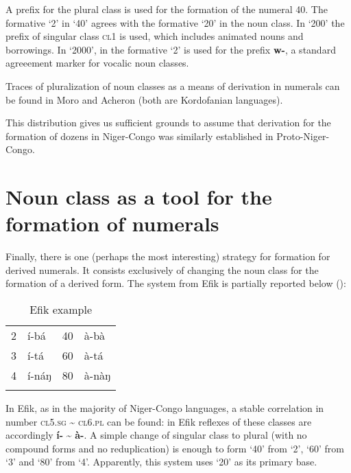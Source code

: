 A prefix for the plural class is used for the formation of the numeral 40. The formative ‘2’ in ‘40’ agrees with the formative ‘20’ in the noun class. In ‘200’ the prefix of singular class \textsc{cl}1 is used, which includes animated nouns and borrowings. In ‘2000’, in the formative ‘2’ is used for the prefix \textbf{w-}, a standard agreeement marker for vocalic noun classes. 

Traces of pluralization of noun classes as a means of derivation in numerals can be found in Moro and Acheron (both are Kordofanian languages). 

\largerpage
This distribution gives us sufficient grounds to assume that derivation for the formation of dozens in Niger-Congo was similarly established in Proto-Niger-Congo. 


\clearpage
\section{Noun class as a tool for the formation of numerals}%

Finally, there is one (perhaps the most interesting) strategy for formation for derived numerals. It consists exclusively of changing the noun class for the formation of a derived form. The system from Efik is partially reported below (): 

\begin{table}
\caption{Efik example}
\label{tab:1:20}

\begin{tabularx}{\textwidth}{lXlX}
\lsptoprule

2 & í-bá & 40 & {\`{a}}-b{\`{a}}\\
3 & í-tá & 60 &   {\`{a}}-tá\\
4 & í-náŋ & 80 &   {\`{a}}-n{\`{a}}ŋ\\
\lspbottomrule
\end{tabularx}
\end{table}



In Efik, as in the majority of Niger-Congo languages, a stable correlation in number \textsc{cl}5.\textsc{sg} {\textasciitilde} \textsc{cl}6.\textsc{pl} can be found: in Efik reflexes of these classes are accordingly \textbf{í-} {\textasciitilde} \textbf{{\`{a}}}\textbf{-}.  A simple change of singular class to plural (with no compound forms and no reduplication) is enough to form ‘40’ from ‘2’, ‘60’ from ‘3’ and ‘80’ from ‘4’. Apparently, this system uses ‘20’ as its primary base.  

